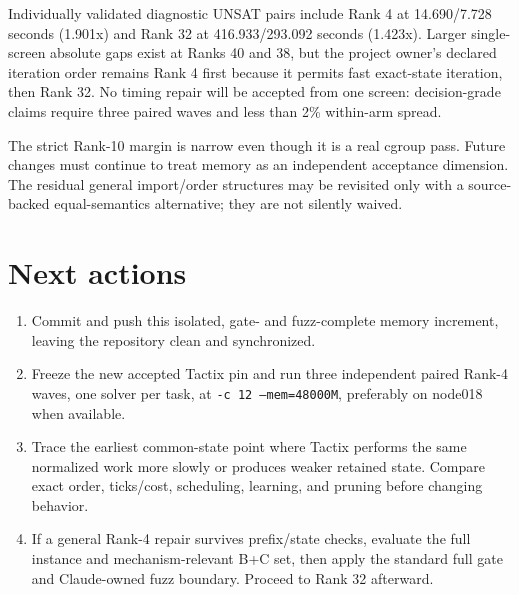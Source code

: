 \documentclass[11pt]{article}
\newcommand{\code}[1]{\texttt{#1}}
\begin{document}
Individually validated diagnostic UNSAT pairs include Rank 4 at
14.690/7.728 seconds (1.901x) and Rank 32 at 416.933/293.092 seconds (1.423x).
Larger single-screen absolute gaps exist at Ranks 40 and 38, but the project
owner's declared iteration order remains Rank 4 first because it permits fast
exact-state iteration, then Rank 32.  No timing repair will be accepted from
one screen: decision-grade claims require three paired waves and less than 2\%
within-arm spread.

The strict Rank-10 margin is narrow even though it is a real cgroup pass.
Future changes must continue to treat memory as an independent acceptance
dimension.  The residual general import/order structures may be revisited only
with a source-backed equal-semantics alternative; they are not silently waived.

\section{Next actions}

\begin{enumerate}
  \item Commit and push this isolated, gate- and fuzz-complete memory increment,
  leaving the repository clean and synchronized.
  \item Freeze the new accepted Tactix pin and run three independent paired
  Rank-4 waves, one solver per task, at \code{-c 12 --mem=48000M}, preferably
  on node018 when available.
  \item Trace the earliest common-state point where Tactix performs the same
  normalized work more slowly or produces weaker retained state.  Compare
  exact order, ticks/cost, scheduling, learning, and pruning before changing
  behavior.
  \item If a general Rank-4 repair survives prefix/state checks, evaluate the
  full instance and mechanism-relevant B+C set, then apply the standard full
  gate and Claude-owned fuzz boundary.  Proceed to Rank 32 afterward.
\end{enumerate}
\end{document}
